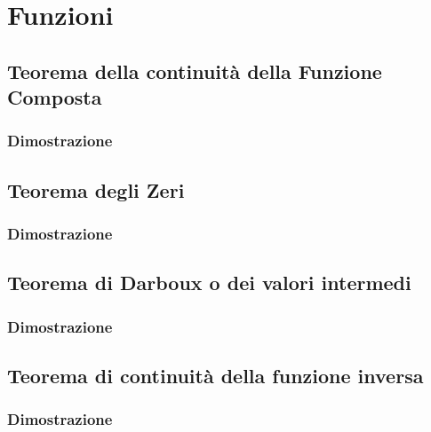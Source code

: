 \documentclass[11pt, a4paper]{article}
\begin{document}
\newpage

\section{Funzioni}
\subsection{Teorema della continuità della Funzione Composta}
\subsubsection*{Dimostrazione}


\subsection{Teorema degli Zeri}
\subsubsection*{Dimostrazione}


\subsection{Teorema di Darboux o dei valori intermedi}
\subsubsection*{Dimostrazione}


\subsection{Teorema di continuità della funzione inversa}
\subsubsection*{Dimostrazione}
\end{document}
